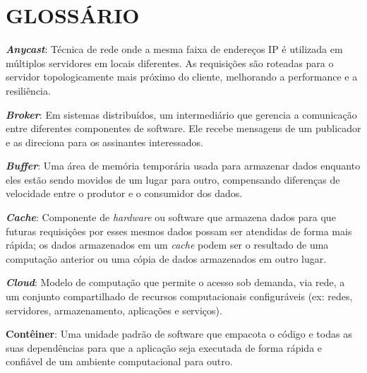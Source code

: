 






\chapter*{GLOSSÁRIO}

{ \setlength{\parindent}{0pt} %

\textbf{\textit{Anycast}}: Técnica de rede onde a mesma faixa de endereços IP é utilizada em múltiplos servidores em locais diferentes. As requisições são roteadas para o servidor topologicamente mais próximo do cliente, melhorando a performance e a resiliência.

\textbf{\textit{Broker}}: Em sistemas distribuídos, um intermediário que gerencia a comunicação entre diferentes componentes de software. Ele recebe mensagens de um publicador e as direciona para os assinantes interessados.

\textbf{\textit{Buffer}}: Uma área de memória temporária usada para armazenar dados enquanto eles estão sendo movidos de um lugar para outro, compensando diferenças de velocidade entre o produtor e o consumidor dos dados.

\textbf{\textit{Cache}}: Componente de \textit{hardware} ou software que armazena dados para que futuras requisições por esses mesmos dados possam ser atendidas de forma mais rápida; os dados armazenados em um \textit{cache} podem ser o resultado de uma computação anterior ou uma cópia de dados armazenados em outro lugar.

\textbf{\textit{Cloud}}: Modelo de computação que permite o acesso sob demanda, via rede, a um conjunto compartilhado de recursos computacionais configuráveis (ex: redes, servidores, armazenamento, aplicações e serviços).

\textbf{Contêiner}: Uma unidade padrão de software que empacota o código e todas as suas dependências para que a aplicação seja executada de forma rápida e confiável de um ambiente computacional para outro.

}
